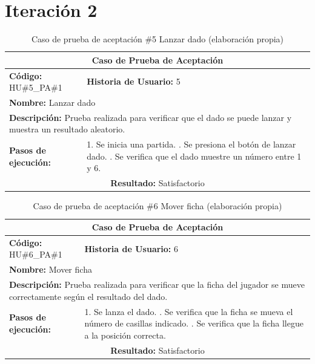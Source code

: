 \section*{Iteración 2}

\begin{table}[H]
\centering
\caption{Caso de prueba de aceptación \#5 Lanzar dado (elaboración propia)\label{tab:cpa5}}
\renewcommand{\arraystretch}{1.3}
\begin{tabular}{|p{}|p{}|}
\hline
\multicolumn{2}{|c|}{\textbf{Caso de Prueba de Aceptación}} \\
\hline
\textbf{Código:} HU\#5\_PA\#1 & \textbf{Historia de Usuario:} 5 \\
\hline
\multicolumn{2}{|l|}{\textbf{Nombre:} Lanzar dado} \\
\hline
\multicolumn{2}{|p{0.9\textwidth}|}{\textbf{Descripción:} Prueba realizada para verificar que el dado se puede lanzar y muestra un resultado aleatorio.} \\
\hline
\textbf{Pasos de ejecución:} & 1. Se inicia una partida. \newline 2. Se presiona el botón de lanzar dado. \newline 3. Se verifica que el dado muestre un número entre 1 y 6. \\
\hline
\multicolumn{2}{|c|}{\textbf{Resultado:} Satisfactorio} \\
\hline
\end{tabular}
\end{table}

\begin{table}[H]
\centering
\caption{Caso de prueba de aceptación \#6 Mover ficha (elaboración propia)\label{tab:cpa6}}
\renewcommand{\arraystretch}{1.3}
\begin{tabular}{|p{}|p{}|}
\hline
\multicolumn{2}{|c|}{\textbf{Caso de Prueba de Aceptación}} \\
\hline
\textbf{Código:} HU\#6\_PA\#1 & \textbf{Historia de Usuario:} 6 \\
\hline
\multicolumn{2}{|l|}{\textbf{Nombre:} Mover ficha} \\
\hline
\multicolumn{2}{|p{0.9\textwidth}|}{\textbf{Descripción:} Prueba realizada para verificar que la ficha del jugador se mueve correctamente según el resultado del dado.} \\
\hline
\textbf{Pasos de ejecución:} & 1. Se lanza el dado. \newline 2. Se verifica que la ficha se mueva el número de casillas indicado. \newline 3. Se verifica que la ficha llegue a la posición correcta. \\
\hline
\multicolumn{2}{|c|}{\textbf{Resultado:} Satisfactorio} \\
\hline
\end{tabular}
\end{table}


